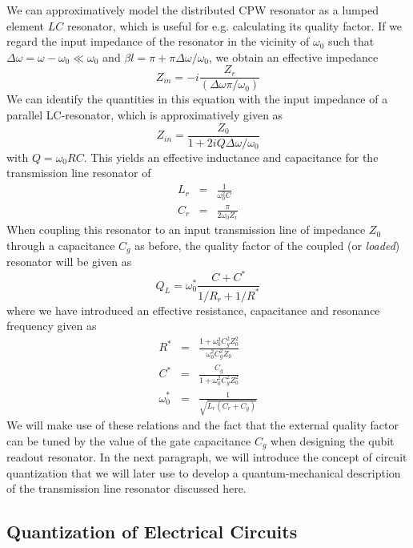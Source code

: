 We can approximatively model the distributed CPW resonator as a lumped element $LC$ resonator, which is useful for e.g. calculating its quality factor. If we regard the input impedance of the resonator in the vicinity of $\omega_0$ such that $\Delta \omega = \omega -\omega_0 \ll \omega_0$ and $\beta l = \pi +\pi\Delta \omega /\omega_0$, we obtain an effective impedance
%
\begin{equation}
Z_{in} = -i\frac{Z_{r}}{(\Delta \omega \pi / \omega_0)}
\end{equation}
%
We can identify the quantities in this equation with the input impedance of a parallel LC-resonator, which is approximatively given as
%
\begin{equation}
Z_{in} = \frac{Z_0}{1+2i Q \Delta \omega / \omega_0}
\end{equation}
%
with $Q=\omega_0 RC$. This yields an effective inductance and capacitance for the transmission line resonator of
%
\begin{eqnarray}
L_{r} & = & \frac{1}{\omega_0^2 C} \\
C_{r} & = & \frac{\pi}{2\omega_0 Z_r}
\end{eqnarray}
%
When coupling this resonator to an input transmission line of impedance $Z_0$ through a  capacitance $C_g$ as before, the quality factor of the coupled (or {\it loaded}) resonator will be given as
%
\begin{equation}
Q_L = \omega_0^* \frac{C+C^*}{1/R_{r}+1/R^*}
\end{equation}
%
where we have introduced an effective resistance, capacitance and resonance frequency given as
%
\begin{eqnarray}
R^* & = & \frac{1+\omega_0^2 C_g^2 Z_0^2}{\omega_0^2 C_g^2 Z_0} \\
C^* & = & \frac{C_g}{1+\omega_0^2 C_g^2 Z_0^2} \\
\omega_0^* & = & \frac{1}{\sqrt{L_r(C_r+C_g)}}
\end{eqnarray}
%
We will make use of these relations and the fact that the external quality factor can be tuned by the value of the gate capacitance $C_g$ when designing the qubit readout resonator. In the next paragraph, we will introduce the concept of circuit quantization that we will later use to develop a quantum-mechanical description of the transmission line resonator discussed here.

\subsection{Quantization of Electrical Circuits}

